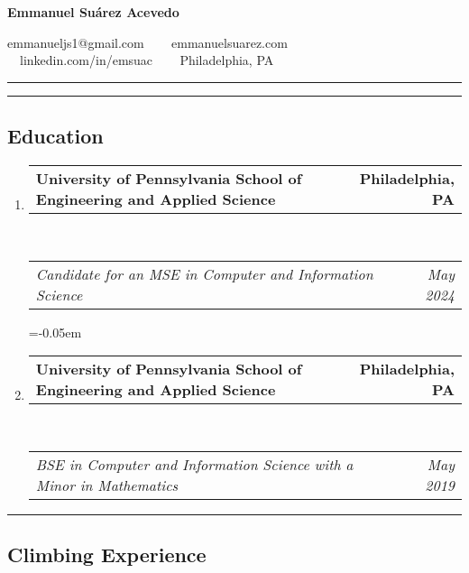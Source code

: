 \documentclass[letterpaper]{article}
\makeatletter
\newcommand{\headerrow}[2]
{\begin{tabular*}{\linewidth}{l@{\extracolsep{\fill}}r}
	#1 &
	#2 \\
\end{tabular*}}
\makeatother
\begin{document}
\begin{center}
{\LARGE \textbf{Emmanuel Suárez Acevedo}}

emmanueljs1@gmail.com \ \textbullet
\ \ emmanuelsuarez.com \\

\ \ linkedin.com/in/emsuac \ \textbullet
\ \ Philadelphia, PA
\end{center}

\hrule

\hrule
\vspace{-0.6em}
\subsection*{Education}

\begin{enumerate}[label=]
	\parskip=-0.05em
	\item 
	\headerrow
		{\textbf{University of Pennsylvania School of Engineering and Applied Science}}
		{\textbf{Philadelphia, PA}}
	\\
	\headerrow
		{\emph{Candidate for an MSE in Computer and Information Science}}
		{\emph{May 2024}}

	\parskip=-0.05em
	\item 
	\headerrow
		{\textbf{University of Pennsylvania School of Engineering and Applied Science}}
		{\textbf{Philadelphia, PA}}
	\\
	\headerrow
		{\emph{BSE in Computer and Information Science with a Minor in Mathematics}}
		{\emph{May 2019}}
\end{enumerate}

\hrule
\vspace{-0.6em}
\subsection*{Climbing Experience}
\end{document}
